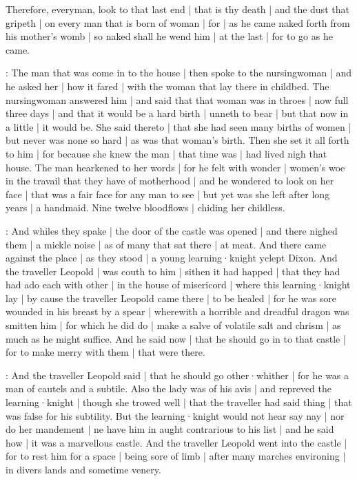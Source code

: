 

Therefore,
everyman,
look to that last end |
that is thy death |
and the dust that gripeth |
on every man that is born of woman |
for |
as he came naked forth from his mother's womb |
so naked shall he wend him |
at the last |
for to go as he came.%


:
The man that was come in to the house |
then spoke to the nursingwoman |
and he asked her |
how it fared |
with the woman that lay there in childbed.
The nursingwoman answered him |
and said that that woman was in throes |
now full three days |
and that it would be a hard birth |
unneth to bear |
but that now in a little |
it would be.
She said thereto |
that she had seen many births of women |
but never was none so hard |
as was that woman's birth.
Then she set it all forth to him |
for because she knew the man |
that time was |
had lived nigh that house.
The man hearkened to her words |
for he felt with wonder |
women's woe in the travail that they have of motherhood |
and he wondered to look on her face |
that was a fair face for any man to see |
but yet was she left after long years |
a handmaid.
Nine twelve bloodflows |
chiding her childless.



:
And whiles they spake |
the door of the castle was opened |
and there nighed them |
a mickle noise |
as of many that sat there |
at meat.
And there came against the place |
as they stood |
a young learning·knight yclept Dixon.
And the traveller Leopold |
was couth to him |
sithen it had happed |
that they had had ado each with other |
in the house of misericord |
where this learning·knight lay |
by cause the traveller Leopold came there |
to be healed |
for he was sore wounded in his breast by a spear |
wherewith a horrible and dreadful dragon was smitten him |
for which he did do |
make a salve of volatile salt and chrism |
as much as he might suffice.
And he said now |
that he should go in to that castle |
for to make merry with them |
that were there.

:
And the traveller Leopold said |
that he should go other·whither |
for he was a man of cautels and a subtile.
Also the lady was of his avis |
and repreved the learning·knight |
though she trowed well |
that the traveller had said thing |
that was false for his subtility.
But the learning·knight would not hear say nay |
nor do her mandement |
ne have him in aught contrarious to his list |
and he said how |
it was a marvellous castle.
And the traveller Leopold went into the castle |
for to rest him for a space |
being sore of limb |
after many marches environing |
in divers lands and sometime venery.

